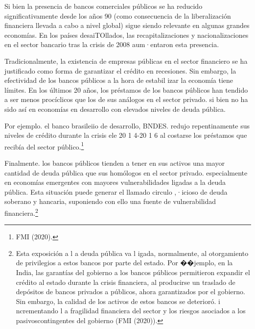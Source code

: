 \documentclass[10pt,a4paper]{article}
\begin{document}
Si bien la presencia de bancos comerciales públicos se ha reducido significativamente desde los años 90 (como consecuencia de la liberalización financiera llevada a cabo a nivel global) sigue siendo relevante en algunas grandes economías. En los países desaiTOllados, las recapitalizaciones y nacionalizaciones en el sector bancario tras la crisis de 2008 aum·entaron esta presencia.

Tradicionalmente, la existencia de empresas públicas en el sector financiero se ha justificado como forma de garantizar el crédito en recesiones. Sin embargo, la efectividad de los bancos públicos a la hora de estabil izar la economía tiene límites. En los últimos 20 años, los préstamos de los bancos públicos han tendido a ser menos procíclicos que los de sus análogos en el sector privado. si bien no ha sido así en economías en desarrollo con elevados niveles de deuda pública.

Por ejemplo. el banco brasileiio de desarrollo, BNDES. redujo repentinamente sus niveles de crédito durante la crisis ele 20 1 4-20 1 6 al costarse los préstamos que recibía del sector público.\footnote{FMI (2020).
}

Finalmente. los bancos públicos tienden a tener en sus activos una mayor cantidad de deuda pública que sus homólogos en el sector privado. especialmente en economías emergentes con mayores vulnerabilidades ligadas a la deuda pública. Esta situación puede generar el llamado circulo ,·icioso de deuda soberano y hancaria, suponiendo con ello una fuente de vulnerabilidad financiera.\footnote{%
    Esta exposición a l a deuda pública va l igada, normalmente, al otorgamiento de privilegios a estos bancos por parte del estado. Por ��jemplo, en la India, las garantías del gobierno a los bancos públicos permitieron expandir el crédito al estado durante la crisis financiera, al producirse un traslado de depósitos de bancos privados a públicos, ahora garantizados por el gobierno. Sin embargo, la calidad de los activos de estos bancos se deterioró. i ncrementando l a fragilidad financiera del sector y los riesgos asociados a los pasivoscontingentes del gobierno (FMI (2020)).
}
\end{document}
